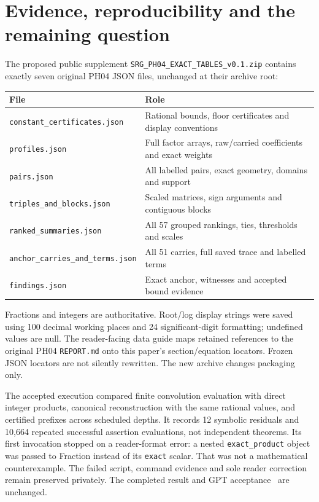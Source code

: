 \documentclass[11pt,a4paper]{article}
\begin{document}
\clearpage
\section{Evidence, reproducibility and the remaining question}
\label{sec:data}
The proposed public supplement \texttt{SRG\_PH04\_EXACT\_TABLES\_v0.1.zip} contains exactly seven original PH04 JSON files, unchanged at their archive root:
\begin{center}\small
\begin{tabular}{@{}lp{.54\linewidth}@{}}\toprule
File & Role\\\midrule
\texttt{constant\_certificates.json} & Rational bounds, floor certificates and display conventions\\
\texttt{profiles.json} & Full factor arrays, raw/carried coefficients and exact weights\\
\texttt{pairs.json} & All labelled pairs, exact geometry, domains and support\\
\texttt{triples\_and\_blocks.json} & Scaled matrices, sign arguments and contiguous blocks\\
\texttt{ranked\_summaries.json} & All 57 grouped rankings, ties, thresholds and scales\\
\texttt{anchor\_carries\_and\_terms.json} & All 51 carries, full saved trace and labelled terms\\
\texttt{findings.json} & Exact anchor, witnesses and accepted bound evidence\\\bottomrule
\end{tabular}
\end{center}
Fractions and integers are authoritative. Root/log display strings were saved using 100 decimal working places and 24 significant-digit formatting; undefined values are null. The reader-facing data guide maps retained references to the original PH04 \texttt{REPORT.md} onto this paper's section/equation locators. Frozen JSON locators are not silently rewritten. The new archive changes packaging only.

The accepted execution compared finite convolution evaluation with direct integer products, canonical reconstruction with the same rational values, and certified prefixes across scheduled depths. It records 12 symbolic residuals and 10,664 repeated successful assertion evaluations, not independent theorems. Its first invocation stopped on a reader-format error: a nested \texttt{exact\_product} object was passed to Fraction instead of its \texttt{exact} scalar. That was not a mathematical counterexample. The failed script, command evidence and sole reader correction remain preserved privately. The completed result and GPT acceptance~\cite{review} are unchanged.
\end{document}
